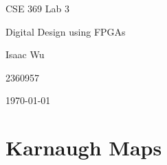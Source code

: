 \documentclass{article}
\date{}
\begin{document}
    

    \begin{titlepage}
        \centering
        \null
        \vspace{5cm}
        {\Huge CSE 369 Lab 3\par}
        \vspace{0.5cm}
        {\Large Digital Design using FPGAs \par}
        \vfill
        {\hfill \Large Isaac Wu \par}
        {\hfill \large 2360957 \par}
        {\hfill \large \today \par}
    \end{titlepage}

\section{Karnaugh Maps}
\end{document}
